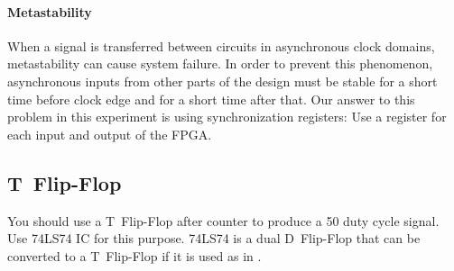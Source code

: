 \documentclass[12pt, logo=tehranDLDL/ut]{tehranDLDL}
\begin{document}
\paragraph*{Metastability}

When a signal is transferred between circuits in asynchronous clock domains, metastability can cause system failure. In order to  prevent this phenomenon, asynchronous inputs from other parts of the design must be stable for a short time before clock edge and for a short time after that. Our answer to this problem in this experiment is using synchronization registers: Use a register for each input and output of the FPGA.

\subsection{T~Flip-Flop}

You should use a T~Flip-Flop after counter to produce a 50 duty cycle signal. Use 74LS74 IC for this purpose. 74LS74 is a dual D~Flip-Flop that can be converted to a T~Flip-Flop if it is used as in .
\end{document}
